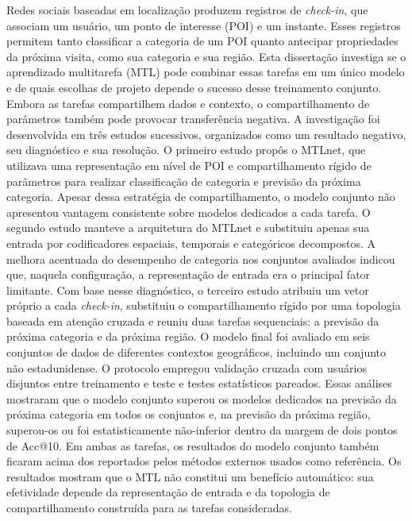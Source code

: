 \begin{resumo}[Resumo]
        \noindent Redes sociais baseadas em localização produzem registros de
        \emph{check-in}, que associam um usuário, um ponto de interesse (POI) e um
        instante. Esses registros permitem tanto classificar a categoria de um POI
        quanto antecipar propriedades da próxima visita, como sua categoria e sua
        região. Esta dissertação investiga se o aprendizado multitarefa (MTL) pode
        combinar essas tarefas em um único modelo e de quais escolhas de projeto
        depende o sucesso desse treinamento conjunto. Embora as tarefas compartilhem
        dados e contexto, o compartilhamento de parâmetros também pode provocar
        transferência negativa. A investigação foi desenvolvida em três estudos
        sucessivos, organizados como um resultado negativo, seu diagnóstico e sua
        resolução. O primeiro estudo propôs o MTLnet, que utilizava uma representação
        em nível de POI e compartilhamento rígido de parâmetros para realizar
        classificação de categoria e previsão da próxima categoria. Apesar dessa
        estratégia de compartilhamento, o modelo conjunto não apresentou vantagem
        consistente sobre modelos dedicados a cada tarefa. O
        segundo estudo manteve a arquitetura do MTLnet e substituiu apenas sua entrada
        por codificadores espaciais, temporais e categóricos decompostos. A melhora
        acentuada do desempenho de categoria nos conjuntos avaliados indicou que,
        naquela configuração, a representação de entrada era o principal fator
        limitante. Com base nesse diagnóstico, o terceiro estudo atribuiu um vetor
        próprio a cada \emph{check-in}, substituiu o compartilhamento rígido por uma
        topologia baseada em atenção cruzada e reuniu duas tarefas sequenciais: a
        previsão da próxima categoria e da próxima região. O modelo final foi avaliado
        em seis conjuntos de dados de diferentes contextos geográficos, incluindo um
        conjunto não estadunidense. O protocolo empregou validação cruzada com usuários
        disjuntos entre treinamento e teste e testes estatísticos pareados.
        Essas análises mostraram que o modelo conjunto superou os modelos dedicados na
        previsão da próxima categoria em todos os conjuntos e, na previsão da próxima
        região, superou-os ou foi estatisticamente não-inferior dentro da margem de dois
        pontos de Acc@10. Em ambas as tarefas, os resultados do modelo conjunto também
        ficaram acima dos reportados pelos métodos externos usados como referência.
        Os resultados mostram que o MTL não constitui um benefício automático: sua efetividade depende da representação de entrada e da topologia de compartilhamento construída para as tarefas consideradas.

\end{resumo}
